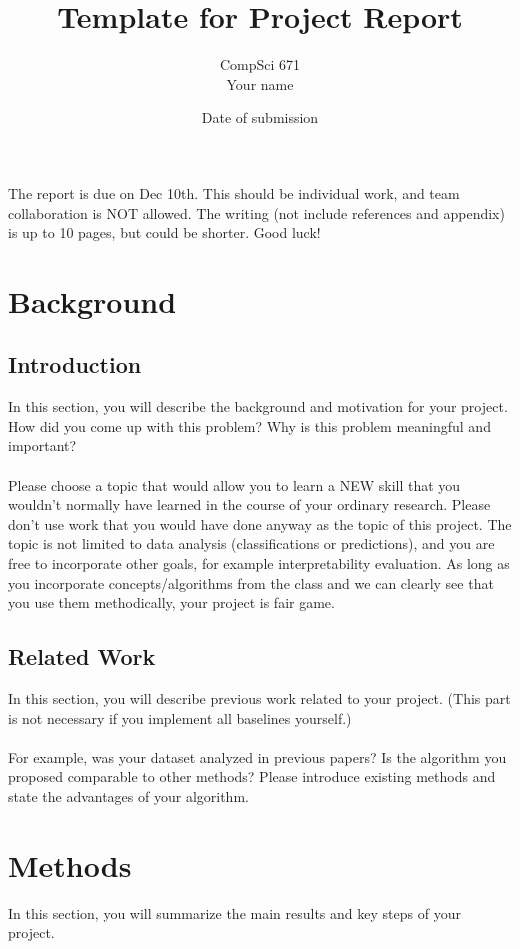 \documentclass[12pt]{article}
\title{Template for Project Report}
\author{CompSci 671\\
Your name}
\date{Date of submission}
\theoremstyle{definition}
\begin{document}
\maketitle

\noindent The report is due on Dec 10th. This should be individual work, and team collaboration is NOT allowed. The writing (not include references and appendix) is up to 10 pages, but could be shorter. Good luck!

\section{Background}
\subsection{Introduction}
In this section, you will describe the background and motivation for your project. How did you come up with this problem? Why is this problem meaningful and important? \\
~\\
Please choose a topic that would allow you to learn a NEW skill that you wouldn't normally have learned in the course of your ordinary research. Please don't use work that you would have done anyway as the topic of this project. The topic is not limited to data analysis (classifications or predictions), and you are free to incorporate other goals, for example interpretability evaluation. As long as you incorporate concepts/algorithms from the class and we can clearly see that you use them methodically, your project is fair game.
\subsection{Related Work}
In this section, you will describe previous work related to your project. (This part is not necessary if you implement all baselines yourself.)\\
~\\
For example, was your dataset analyzed in previous papers? Is the algorithm you proposed comparable to other methods? Please introduce existing methods and state the advantages of your algorithm.
\section{Methods}
In this section, you will summarize the main results and key steps of your project.\\
~\\
\end{document}
